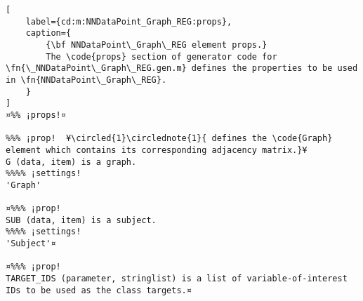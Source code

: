 \documentclass{tufte-handout}
\begin{document}
\begin{lstlisting}[
	label={cd:m:NNDataPoint_Graph_REG:props},
	caption={
		{\bf NNDataPoint\_Graph\_REG element props.}
		The \code{props} section of generator code for \fn{\_NNDataPoint\_Graph\_REG.gen.m} defines the properties to be used in \fn{NNDataPoint\_Graph\_REG}.
	}
]
¤%% ¡props!¤

%%% ¡prop!  ¥\circled{1}\circlednote{1}{ defines the \code{Graph} element which contains its corresponding adjacency matrix.}¥
G (data, item) is a graph.
%%%% ¡settings!
'Graph'

¤%%% ¡prop!
SUB (data, item) is a subject.
%%%% ¡settings!
'Subject'¤

¤%%% ¡prop!
TARGET_IDS (parameter, stringlist) is a list of variable-of-interest IDs to be used as the class targets.¤

\end{lstlisting}

\clearpage
\end{document}
